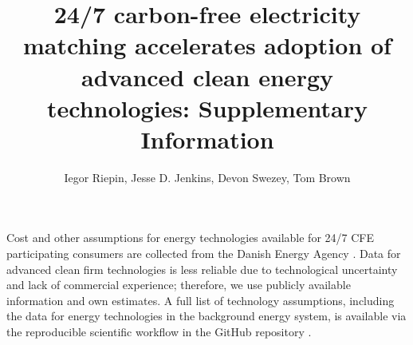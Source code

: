 \documentclass[pdflatex,sn-basic, Numbered]{sn-jnl}
\begin{document}
\title{24/7 carbon-free electricity matching accelerates adoption of advanced clean energy technologies: Supplementary Information}
\author{Iegor Riepin, Jesse D. Jenkins, Devon Swezey, Tom Brown}
\maketitle

Cost and other assumptions for energy technologies available for 24/7 CFE participating consumers are collected from the Danish Energy Agency \cite{DEA-technologydata}.
Data for advanced clean firm technologies is less reliable due to technological uncertainty and lack of commercial experience; therefore, we use publicly available information and own estimates.
A full list of technology assumptions, including the data for energy technologies in the background energy system, is available via the reproducible scientific workflow in the GitHub repository \cite{code247CFE}.
\end{document}
